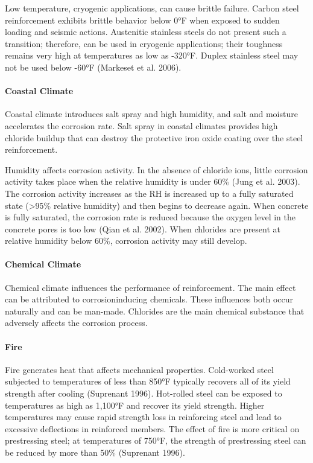 Low temperature, cryogenic applications, can cause brittle failure. Carbon steel reinforcement exhibits brittle
behavior below 0°F when exposed to sudden loading and seismic actions. Austenitic stainless steels do not present
such a transition; therefore, can be used in cryogenic applications; their toughness remains very high at temperatures
as low as -320°F. Duplex stainless steel may not be used below -60°F (Markeset et al. 2006).

\paragraph{Coastal Climate}
Coastal climate introduces salt spray and high humidity, and salt and moisture accelerates the corrosion rate. Salt
spray in coastal climates provides high chloride buildup that can destroy the protective iron oxide coating over the
steel reinforcement.

Humidity affects corrosion activity. In the absence of chloride ions, little corrosion activity takes place when the relative humidity is under 60\% (Jung et al. 2003). The corrosion activity increases as the RH is increased up to a fully saturated state (>95\% relative humidity) and then begins to decrease again. When concrete is fully saturated, the corrosion rate is reduced because the oxygen level in the concrete pores is too low (Qian et al. 2002). When chlorides are present at relative humidity below 60\%, corrosion activity may still develop.

\paragraph{Chemical Climate}
Chemical climate influences the performance of reinforcement. The main effect can be attributed to corrosioninducing chemicals. These influences both occur naturally and can be man-made. Chlorides are the main chemical substance that adversely affects the corrosion process.

\paragraph{Fire}
Fire generates heat that affects mechanical properties. Cold-worked steel subjected to temperatures of less than 850°F typically recovers all of its yield strength after cooling (Suprenant 1996). Hot-rolled steel can be exposed to temperatures as high as 1,100°F and recover its yield strength. Higher temperatures may cause rapid strength loss in reinforcing steel and lead to excessive deflections in reinforced members. The effect of fire is more critical on prestressing steel; at temperatures of 750°F, the strength of prestressing steel can be reduced by more than 50\% (Suprenant 1996). 

